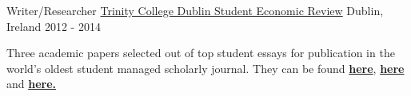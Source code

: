 \begin{cventries}
  \cventry
    {Writer/Researcher}
    {\href{https://www.tcd.ie/Economics/SER/}{Trinity College Dublin Student Economic Review}}
    {Dublin, Ireland}
    {2012 - 2014}
    {
      \begin{cvitems}
        \item {Three academic papers selected out of top student essays for publication in the world's oldest student managed scholarly journal. They can be found \href{https://www.tcd.ie/Economics/assets/pdf/SER/2013/Andrew_Winterbotham_2.pdf}{\textcolor{awesome-skyblue}{\textbf{here}}}, \href{https://www.tcd.ie/Economics/assets/pdf/SER/2013/Andrew_Winterbotham.pdf}{\textcolor{awesome-skyblue}{\textbf{here}}} and \href{https://www.tcd.ie/Economics/assets/pdf/SER/2012/Externalities.pdf}{\textcolor{awesome-skyblue}{\textbf{here.}}}}
      \end{cvitems}
    }
 
    
 
\end{cventries}
